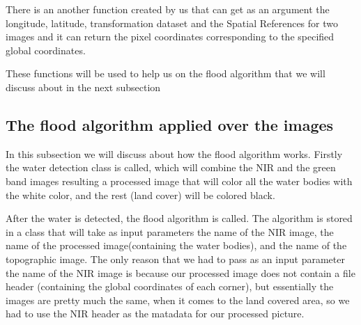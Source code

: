 \documentclass[12pt, a4paper]{report}
\begin{document}
\quad
There is an another function created by us that can get as an argument the longitude, latitude, transformation dataset and the Spatial References for two images and it can return the pixel coordinates corresponding to the specified global coordinates.
\par 
These functions will be used to help us on the flood algorithm that we will discuss about in the next subsection




\subsection{The flood algorithm applied over the images}

\quad
In this subsection we will discuss about how the flood algorithm works. Firstly the water detection class is called, which will combine the NIR and the green band images resulting a processed image that will color all the water bodies with the white color, and the rest (land cover) will be colored black.
\par 
 After the water is detected, the flood algorithm is called. The algorithm is stored in a class that will take as input parameters the name of the NIR image, the name of the processed image(containing the water bodies), and the name of the topographic image. The only reason that we had to pass as an input parameter the name of the NIR image is because our processed image does not contain a file header (containing the global coordinates of each corner), but essentially the images are pretty much the same, when it comes to the land covered area, so we had to use the NIR header as the matadata for our processed picture.
\par
\end{document}
